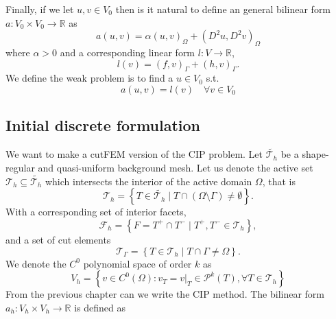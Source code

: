     Finally, if we let $u,v \in V_{0}$ then is it natural to define an general bilinear form $ a: V_{0} \times  V_{0} \to   \mathbb{R} $ as \[
    a( u,v) = \alpha ( u,v)_{\Omega } + ( D^2u, D^2v)_{\Omega }
    \]
    where $\alpha >0$ and a corresponding linear form $l: V \to \mathbb{R} $,
    \[
    l( v) = ( f ,v)_{\Gamma } +  ( h,v)_{\Gamma } .
    \]
    We define the weak problem is to find a $u \in  V_{0}$ s.t. \[
    a( u,v) = l(v) \quad  \forall v \in V_{0}
    \]

\subsection{Initial discrete formulation}%
\label{sub:initial_discrete_formulation}

We want to make a cutFEM version of the CIP problem. Let $\widetilde{\mathcal{T}_{h} } $ be a shape-regular and quasi-uniform background mesh. Let us denote the active set $\mathcal{T} _{h} \subseteq \widetilde{\mathcal{T}_{h}}$ which intersects the interior of the active domain $\Omega $, that is  \[
\mathcal{T} _{h} = \left\{ T \in \widetilde{\mathcal{T} _{h}}  \mid  T \cap (\Omega \setminus \Gamma ) \neq \emptyset    \right\} .
\]
With a corresponding set of interior facets, \[
    \mathcal{F} _{h} = \left\{ F = T^{+} \cap T^{-}  \mid  T^{+}, T^{-} \in \mathcal{T} _{h} \right\},
\]
and a set of cut elements \[
\mathcal{T} _{\Gamma } = \left\{ T \in \mathcal{T} _{h}   \mid  T \cap \Gamma \neq \Omega \right\}.
\]
We denote the $C^{0}$ polynomial space of order $k$ as
\[
V_{h} = \left\{ v \in C^{0}\left( \Omega  \right): v_{T} = v | _{T} \in \mathcal{P} ^{k}\left( T \right), \forall T \in
\mathcal{T}_{h}    \right\}
\]
From the previous chapter can we write the CIP method. The bilinear form $a_{h}:  V_{h}\times  V_{h} \to \mathbb{R} $ is defined as

